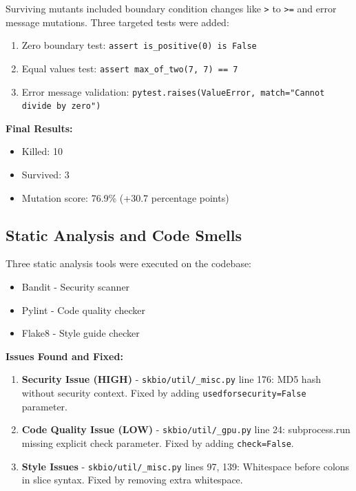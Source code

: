 \documentclass[11pt]{article}
\begin{document}
Surviving mutants included boundary condition changes like \texttt{>} to \texttt{>=} and error message mutations. Three targeted tests were added:

\begin{enumerate}[noitemsep]
    \item Zero boundary test: \texttt{assert is\_positive(0) is False}
    \item Equal values test: \texttt{assert max\_of\_two(7, 7) == 7}
    \item Error message validation: \texttt{pytest.raises(ValueError, match="Cannot divide by zero")}
\end{enumerate}

\textbf{Final Results:}
\begin{itemize}[noitemsep]
    \item Killed: 10
    \item Survived: 3
    \item Mutation score: 76.9\% (+30.7 percentage points)
\end{itemize}

\subsection{Static Analysis and Code Smells}

Three static analysis tools were executed on the codebase:

\begin{itemize}[noitemsep]
    \item Bandit - Security scanner
    \item Pylint - Code quality checker
    \item Flake8 - Style guide checker
\end{itemize}

\textbf{Issues Found and Fixed:}

\begin{enumerate}
    \item \textbf{Security Issue (HIGH)} - \texttt{skbio/util/\_misc.py} line 176: MD5 hash without security context. Fixed by adding \texttt{usedforsecurity=False} parameter.

    \item \textbf{Code Quality Issue (LOW)} - \texttt{skbio/util/\_gpu.py} line 24: subprocess.run missing explicit check parameter. Fixed by adding \texttt{check=False}.

    \item \textbf{Style Issues} - \texttt{skbio/util/\_misc.py} lines 97, 139: Whitespace before colons in slice syntax. Fixed by removing extra whitespace.
\end{enumerate}
\end{document}
